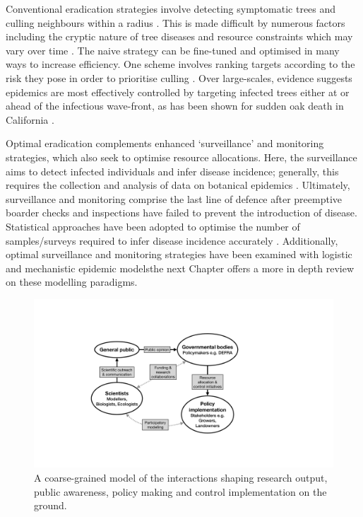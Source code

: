 Conventional eradication strategies involve detecting symptomatic trees and culling neighbours within a radius \cite{WEBIDEMICS}.
This is made difficult by numerous factors including the cryptic nature of tree diseases and resource constraints which may vary
over time \cite{control-theory, control-theory-application}. The naive strategy can be fine-tuned and optimised in many ways to increase
efficiency. One scheme involves ranking targets according to the risk they pose in order to prioritise culling \cite{risk-potential-control}.
Over large-scales, evidence suggests epidemics are most effectively controlled by targeting infected trees either at or ahead of
the infectious wave-front, as has been shown for sudden oak death in California \cite{large-scale-control}.


Optimal eradication complements enhanced `surveillance' and monitoring strategies, 
which also seek to optimise resource allocations. Here, the surveillance aims to detect infected individuals and infer disease incidence;
generally, this requires the collection and analysis of data on botanical epidemics \cite{surveillance-review}.
Ultimately, surveillance and monitoring comprise the last line of defence after preemptive boarder 
checks and inspections have failed to prevent the introduction of disease. 
Statistical approaches have been adopted to optimise the number of samples/surveys required to infer disease incidence accurately \cite{yamamura2016sampling}.
Additionally, optimal surveillance and monitoring strategies have been examined with logistic \cite{parnell2012estimating} 
and mechanistic \cite{risk-potential-control} epidemic models\textemdash the next Chapter offers a more in depth review on these modelling paradigms.

\begin{figure}
    \centering
    \includegraphics[scale=0.35]{chapter1/figures/modelling-and-policy.pdf}
    \caption{A coarse-grained model of the interactions shaping research output, public awareness, policy making and 
    control implementation on the ground. }
    \label{fig:modelling-and-policies}
\end{figure}

